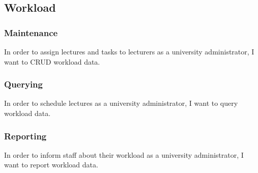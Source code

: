 \subsection{Workload}
\subsubsection{Maintenance}
In order to assign lectures and tasks to lecturers as a university administrator,
I want to CRUD workload data.

\subsubsection{Querying}
In order to schedule lectures as a university administrator, I want to query
workload data.

\subsubsection{Reporting}
In order to inform staff about their workload as a university administrator, I
want to report workload data.
